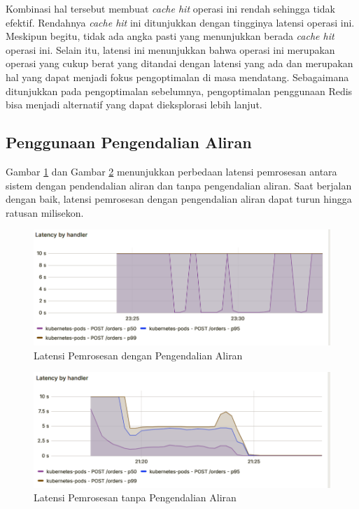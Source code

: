 Kombinasi hal tersebut membuat \textit{cache hit} operasi ini rendah sehingga tidak efektif. Rendahnya \textit{cache hit} ini ditunjukkan dengan tingginya latensi operasi ini. Meskipun begitu, tidak ada angka pasti yang menunjukkan berada \textit{cache hit} operasi ini. Selain itu, latensi ini menunjukkan bahwa operasi ini merupakan operasi yang cukup berat yang ditandai dengan latensi yang ada dan merupakan hal yang dapat menjadi fokus pengoptimalan di masa mendatang. Sebagaimana ditunjukkan pada pengoptimalan sebelumnya, pengoptimalan penggunaan Redis bisa menjadi alternatif yang dapat dieksplorasi lebih lanjut.

\subsection{Penggunaan Pengendalian Aliran}

Gambar \ref{fig:latency-fc} dan Gambar \ref{fig:latency-nofc} menunjukkan perbedaan latensi pemrosesan antara sistem dengan pendendalian aliran dan tanpa pengendalian aliran. Saat berjalan dengan baik, latensi pemrosesan dengan pengendalian aliran dapat turun hingga ratusan milisekon.

\begin{figure}[H]
    \centering
    \includegraphics[width=1\textwidth]{resources/chapter-4/latency-fc-pg-stress-0.png}
    \caption{Latensi Pemrosesan dengan Pengendalian Aliran}
    \label{fig:latency-fc}
\end{figure}

\begin{figure}[H]
    \centering
    \includegraphics[width=1\textwidth]{resources/chapter-4/latency-nofc-pg-stress-0.png}
    \caption{Latensi Pemrosesan tanpa Pengendalian Aliran}
    \label{fig:latency-nofc}
\end{figure}

